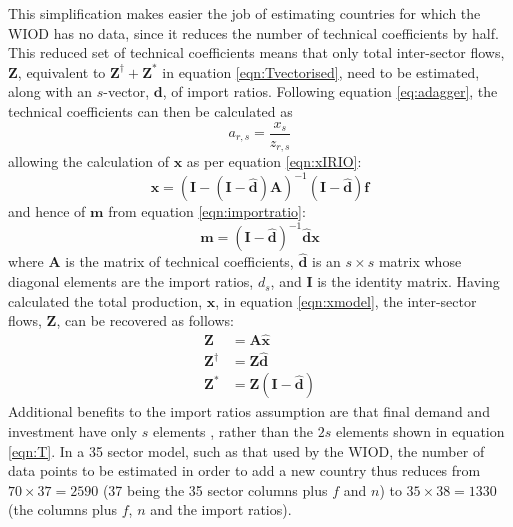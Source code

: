\documentclass[a4paper]{article}
\begin{document}
This simplification makes easier the job of estimating countries for which the WIOD has no data, since it reduces the number of technical coefficients by half.
This reduced set of technical coefficients means that only total inter-sector flows, $\boldsymbol{Z}$, equivalent to $\boldsymbol{Z}^{\dagger} + \boldsymbol{Z}^{*}$ in equation \eqref{eqn:Tvectorised}, need to be estimated, along with an $s$-vector, $\boldsymbol{d}$, of import ratios. 
Following equation \eqref{eq:adagger}, the technical coefficients can then be calculated as
\begin{equation}
a_{r,s} = \frac{x_s}{z_{r,s}}
\end{equation}
allowing the calculation of $\boldsymbol{x}$ as per equation \eqref{eqn:xIRIO}:
\begin{equation}
\boldsymbol{x} = 
(\boldsymbol{I} - 
(\boldsymbol{I} - \boldsymbol{\hat{d}})
\boldsymbol{A})^{-1} 
(\boldsymbol{I} - \boldsymbol{\hat{d}})\boldsymbol{f}\label{eqn:xmodel}
\end{equation}
and hence of $\boldsymbol{m}$ from equation \eqref{eqn:importratio}:
\begin{equation}
\boldsymbol{m} = 
(\boldsymbol{I} - 
\boldsymbol{\hat{d}})^{-1} 
\boldsymbol{\hat{d}}\boldsymbol{x}\label{eqn:mmodel}
\end{equation}
where $\boldsymbol{A}$ is the matrix of technical coefficients, $\boldsymbol{\hat{d}}$ is an $s \times s$ matrix whose diagonal elements are the import ratios, $d_s$, and $\boldsymbol{I}$ is the identity matrix.
Having calculated the total production, $\boldsymbol{x}$, in equation \eqref{eqn:xmodel}, the inter-sector flows, $\boldsymbol{Z}$, can be recovered as follows:
\begin{align}
\boldsymbol{Z}& = \boldsymbol{A}\boldsymbol{\hat{x}}\nonumber\\
\boldsymbol{Z^\dagger}& = \boldsymbol{Z}\boldsymbol{\hat{d}}\\
\boldsymbol{Z^*}& = \boldsymbol{Z}
(\boldsymbol{I} - \boldsymbol{\hat{d}}) \label{eqn:zstar}
\end{align}
Additional benefits to the import ratios assumption are that final demand and investment have only $s$ elements , rather than the $2s$ elements shown in equation \eqref{eqn:T}.
In a 35 sector model, such as that used by the WIOD, the number of data points to be estimated in order to add a new country thus reduces from $70 \times 37 = 2590$ (37 being the 35 sector columns plus $f$ and $n$) to $35 \times 38 = 1330$ (the columns plus $f$, $n$ and the import ratios).
\end{document}
